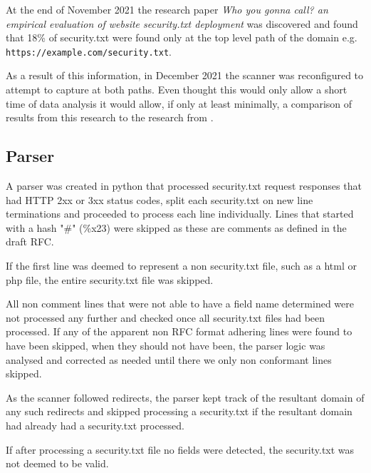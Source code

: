\documentclass{mscreport}
\begin{document}
\vspace{0.3cm} \noindent
At the end of November 2021 the research paper \textit{Who you gonna call? an empirical evaluation of website security.txt deployment} \cite{Poteat2021-zr} was discovered and found that 18\% of security.txt were found only at the top level path of the domain e.g. \newline \texttt{https://example.com/security.txt}.

\vspace{0.3cm} \noindent
As a result of this information, in December 2021 the scanner was reconfigured to attempt to capture at both paths. Even thought this would only allow a short time of data analysis it would allow, if only at least minimally, a comparison of results from this research to the research from \cite{Poteat2021-zr}.

\subsection{Parser}

A parser was created in python that processed security.txt request responses that had HTTP 2xx or 3xx status codes, split each security.txt on new line terminations and proceeded to process each line individually. Lines that started with a hash "\#" (\%x23) were skipped as these are comments as defined in the draft RFC.

\vspace{0.3cm} \noindent
If the first line was deemed to represent a non security.txt file, such as a html or php file, the entire security.txt file was skipped.

\vspace{0.3cm} \noindent
All non comment lines that were not able to have a field name determined were not processed any further and checked once all security.txt files had been processed. If any of the apparent non RFC format adhering lines were found to have been skipped, when they should not have been, the parser logic was analysed and corrected as needed until there we only non conformant lines skipped.

\vspace{0.3cm} \noindent
As the scanner followed redirects, the parser kept track of the resultant domain of any such redirects and skipped processing a security.txt if the resultant domain had already had a security.txt processed.

\vspace{0.3cm} \noindent
If after processing a security.txt file no fields were detected, the security.txt was not deemed to be valid.
\end{document}
